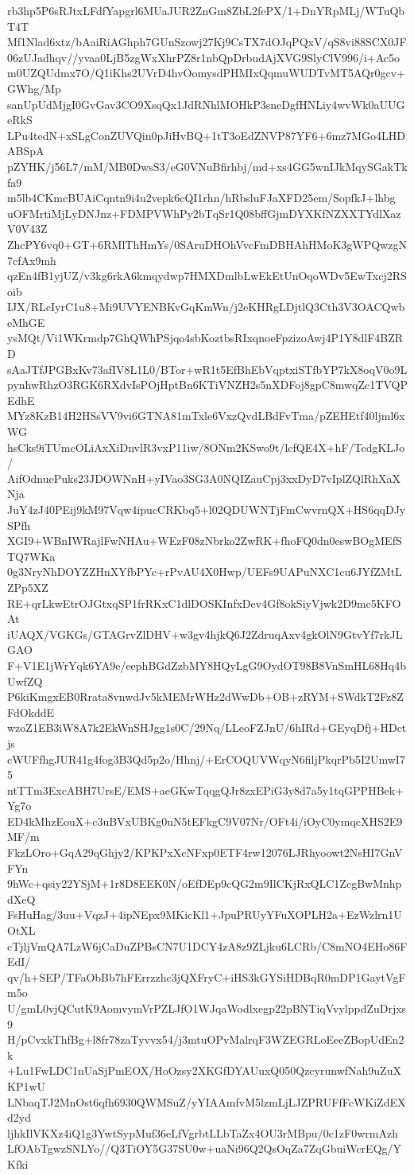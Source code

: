 rb3hp5P6sRJtxLFdfYapgrl6MUaJUR2ZnGm8ZbL2fePX/1+DnYRpMLj/WTuQbT4T
Mf1Nlad6xtz/bAaiRiAGhph7GUnSzowj27Kj9CsTX7dOJqPQxV/qS8vi88SCX0JF
06zUJadhqv//yvaa0LjB5zgWxXhrPZ8r1nbQpDrbudAjXVG9SlyClV996/i+Ac5o
m0UZQUdmx7O/Q1iKhs2UVrD4hvOomysdPHMIxQqmuWUDTvMT5AQr0gcv+GWhg/Mp
sanUpUdMjgI0GvGav3CO9XsqQx1JdRNhlMOHkP3sneDgfHNLiy4wvWk0aUUGeRkS
LPu4tedN+xSLgConZUVQin0pJiHvBQ+1tT3oEdZNVP87YF6+6mz7MGo4LHDABSpA
pZYHK/j56L7/mM/MB0DwsS3/eG0VNuBfirhbj/md+xs4GG5wnIJkMqySGakTkfa9
m5lb4CKmcBUAiCqntn9i4u2vepk6cQI1rhn/hRbsluFJaXFD25em/SopfkJ+lhbg
uOFMrtiMjLyDNJnz+FDMPVWhPy2bTqSr1Q08bffGjmDYXKfNZXXTYdlXazV0V43Z
ZhcPY6vq0+GT+6RMlThHmYs/0SAruDHOhVvcFmDBHAhHMoK3gWPQwzgN7cfAx9mh
qzEn4fB1yjUZ/v3kg6rkA6kmqydwp7HMXDmlbLwEkEtUnOqoWDv5EwTxcj2RSoib
IJX/RLcIyrC1u8+Mi9UVYENBKvGqKmWn/j2eKHRgLDjtlQ3Cth3V3OACQwbeMhGE
ysMQt/Vi1WKrmdp7GhQWhPSjqo4sbKoztbsRIxqnoeFpzizoAwj4P1Y8dlF4BZRD
sAaJTfJPGBxKv73afIV8L1L0/BTor+wR1t5EfBhEbVqptxiSTfbYP7kX8oqV0o9L
pynhwRhzO3RGK6RXdvIsPOjHptBn6KTiVNZH2s5nXDFoj8gpC8mwqZc1TVQPEdhE
MYz8KzB14H2HSsVV9vi6GTNA81mTxle6VxzQvdLBdFvTma/pZEHEtf40ljml6xWG
hsCks9iTUmcOLiAxXiDnvlR3vxP11iw/8ONm2KSwo9t/lcfQE4X+hF/TcdgKLJo/
AifOdnuePuks23JDOWNnH+yIVao3SG3A0NQIZauCpj3xxDyD7vIplZQlRhXaXNja
JuY4zJ40PEij9kM97Vqw4ipucCRKbq5+l02QDUWNTjFmCwvrnQX+HS6qqDJySPfh
XGI9+WBnIWRajlFwNHAu+WEzF08zNbrko2ZwRK+fhoFQ0dn0eswBOgMEfSTQ7WKa
0g3NryNhDOYZZHnXYfbPYc+rPvAU4X0Hwp/UEFs9UAPuNXC1cu6JYfZMtLZPp5XZ
RE+qrLkwEtrOJGtxqSP1frRKxC1dlDOSKInfxDev4Gf8okSiyVjwk2D9mc5KFOAt
iUAQX/VGKGs/GTAGrvZlDHV+w3gv4hjkQ6J2ZdruqAxv4gkOlN9GtvYf7rkJLGAO
F+V1E1jWrYqk6YA9e/eephBGdZzbMY8HQyLgG9OydOT98B8VnSmHL68Hq4bUwfZQ
P6kiKmgxEB0Rrata8vnwdJv5kMEMrWHz2dWwDb+OB+zRYM+SWdkT2Fz8ZFdOkddE
wzoZ1EB3iW8A7k2EkWnSHJgg1s0C/29Nq/LLeoFZJnU/6hIRd+GEyqDfj+HDctjs
cWUFfhgJUR41g4fog3B3Qd5p2o/Hhnj/+ErCOQUVWqyN6filjPkqrPb5I2UmwI75
ntTTm3ExcABH7UrsE/EMS+aeGKwTqqgQJr8zxEPiG3y8d7a5y1tqGPPHBek+Yg7o
ED4kMhzEouX+c3uBVxUBKg0uN5tEFkgC9V07Nr/OFt4i/iOyC0ymqcXHS2E9MF/m
FkzLOro+GqA29qGhjy2/KPKPxXcNFxp0ETF4rw12076LJRhyoowt2NsHI7GnVFYn
9hWc+qsiy22YSjM+1r8D8EEK0N/oEfDEp9cQG2m9IlCKjRxQLC1ZcgBwMnhpdXeQ
FsHuHag/3uu+VqzJ+4ipNEpx9MKicKl1+JpuPRUyYFuXOPLH2a+EzWzlrn1UOtXL
cTjljVmQA7LzW6jCaDuZPBsCN7U1DCY4zA8z9ZLjku6LCRb/C8mNO4EHo86FEdI/
qv/h+SEP/TFaObBb7hFErrzzhc3jQXFryC+iHS3kGYSiHDBqR0mDP1GaytVgFm5o
U/gmL0vjQCutK9AomvymVrPZLJfO1WJqaWodlxegp22pBNTiqVvylppdZuDrjxs9
H/pCvxkThfBg+l8fr78zaTyvvx54/j3mtuOPvMalrqF3WZEGRLoEeeZBopUdEn2k
+Lu1FwLDC1nUaSjPmEOX/HoOzsy2XKGfDYAUuxQ050QzcyrunwfNah9uZuXKP1wU
LNbaqTJ2MnOst6qfh6930QWMSuZ/yYIAAmfvM5lzmLjLJZPRUFfFcWKiZdEXd2yd
ljhkIlVKXz4iQ1g3YwtSypMuf36eLfVgrbtLLbTaZx4OU3rMBpu/0c1zF0wrmAzh
LfOAbTgwzSNLYo//Q3TiOY5G37SU0w+uaNi96Q2QsOqZa7ZqGbuiWcrEQg/YKfki

